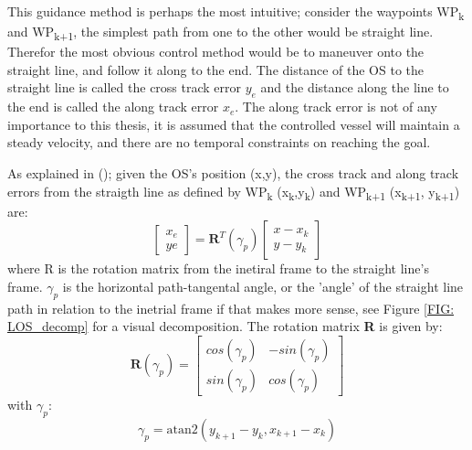 This guidance method is perhaps the most intuitive; consider the waypoints WP\textsubscript{k} and WP\textsubscript{k+1}, the simplest path
from one to the other would be straight line. Therefor the most obvious control method would be to maneuver onto the straight line, and
follow it along to the end. The distance of the \gls{OS} to the straight line is called the cross track error $y_e$ and the distance along the line
to the end is called the along track error $x_e$. The along track error is not of any importance to this thesis, it is assumed that the controlled
vessel will maintain a steady velocity, and there are no temporal constraints on reaching the goal.

As explained in (\cite{lekkas2013line}); given the \gls{OS}'s position (x,y), the cross track and along track errors from the straigth line as defined by WP\textsubscript{k} (x\textsubscript{k},y\textsubscript{k})
and WP\textsubscript{k+1} (x\textsubscript{k+1}, y\textsubscript{k+1}) are:
\begin{equation}\label{EQ: cross and along track error} %
    \begin{bmatrix}
        x_e \\
         ye
    \end{bmatrix} = \textbf{R}^T(\gamma_p) \begin{bmatrix}
                                            x - x_k \\
                                            y - y_k
                                            \end{bmatrix}
\end{equation}
where R is the rotation matrix from the inetiral frame to the straight line's frame. $\gamma_p$ is the horizontal path-tangental angle,
or the 'angle' of the straight line path in relation to the inetrial frame if that makes more sense, see Figure \ref{FIG: LOS_decomp} for a visual
decomposition. The rotation matrix \textbf{R} is given by:
\begin{equation} %
    \textbf{R}(\gamma_p) = \begin{bmatrix}
                            cos(\gamma_p) & -sin(\gamma_p) \\
                            sin(\gamma_p) & cos(\gamma_p)
                            \end{bmatrix}
\end{equation}
with $\gamma_p$:
\begin{equation} %
    \gamma_p = \textrm{atan2}(y_{k+1} - y_k , x_{k+1} - x_k)
\end{equation}

